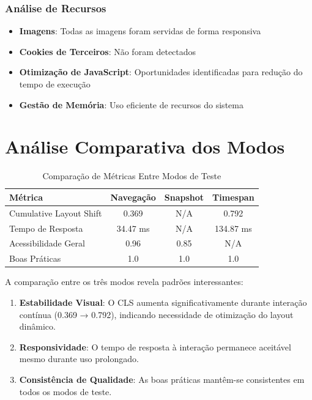 \subsubsection{Análise de Recursos}

\begin{itemize}
    \item \textbf{Imagens}: Todas as imagens foram servidas de forma responsiva
    \item \textbf{Cookies de Terceiros}: Não foram detectados
    \item \textbf{Otimização de JavaScript}: Oportunidades identificadas para redução do tempo de execução
    \item \textbf{Gestão de Memória}: Uso eficiente de recursos do sistema
\end{itemize}

\section{Análise Comparativa dos Modos}

\begin{table}[h]
\centering
\caption{Comparação de Métricas Entre Modos de Teste}
\begin{tabular}{|l|c|c|c|}
\hline
\textbf{Métrica} & \textbf{Navegação} & \textbf{Snapshot} & \textbf{Timespan} \\
\hline
Cumulative Layout Shift & 0.369 & N/A & 0.792 \\
\hline
Tempo de Resposta & 34.47 ms & N/A & 134.87 ms \\
\hline
Acessibilidade Geral & 0.96 & 0.85 & N/A \\
\hline
Boas Práticas & 1.0 & 1.0 & 1.0 \\
\hline
\end{tabular}
\end{table}

A comparação entre os três modos revela padrões interessantes:

\begin{enumerate}
    \item \textbf{Estabilidade Visual}: O CLS aumenta significativamente durante interação contínua (0.369 → 0.792), indicando necessidade de otimização do layout dinâmico.
    
    \item \textbf{Responsividade}: O tempo de resposta à interação permanece aceitável mesmo durante uso prolongado.
    
    \item \textbf{Consistência de Qualidade}: As boas práticas mantêm-se consistentes em todos os modos de teste.
\end{enumerate}

